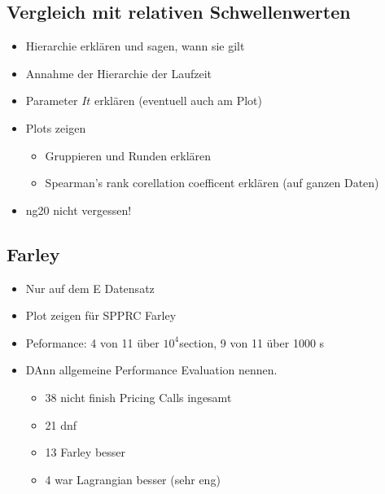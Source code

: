 \documentclass{article}
\begin{document}
\subsection*{Vergleich mit relativen Schwellenwerten}
\begin{itemize}
    \item Hierarchie erklären und sagen, wann sie gilt
    \item Annahme der Hierarchie der Laufzeit
    \item Parameter $It$ erklären (eventuell auch am Plot)
    \item Plots zeigen
    \begin{itemize}
        \item Gruppieren und Runden erklären
        \item Spearman's rank corellation coefficent erklären (auf ganzen Daten)
    \end{itemize}
    \item ng20 nicht vergessen!
\end{itemize}

\subsection*{Farley}
\begin{itemize}
    \item Nur auf dem E Datensatz
    \item Plot zeigen für SPPRC Farley
    \item Peformance: 4 von 11 über $10^4$section, 9 von 11 über 1000 s
    \item DAnn allgemeine Performance Evaluation nennen.
    \begin{itemize}
        \item 38 nicht finish Pricing Calls ingesamt
        \item 21 dnf
        \item 13 Farley besser
        \item 4 war Lagrangian besser (sehr eng)
    \end{itemize}
\end{itemize}
\end{document}
